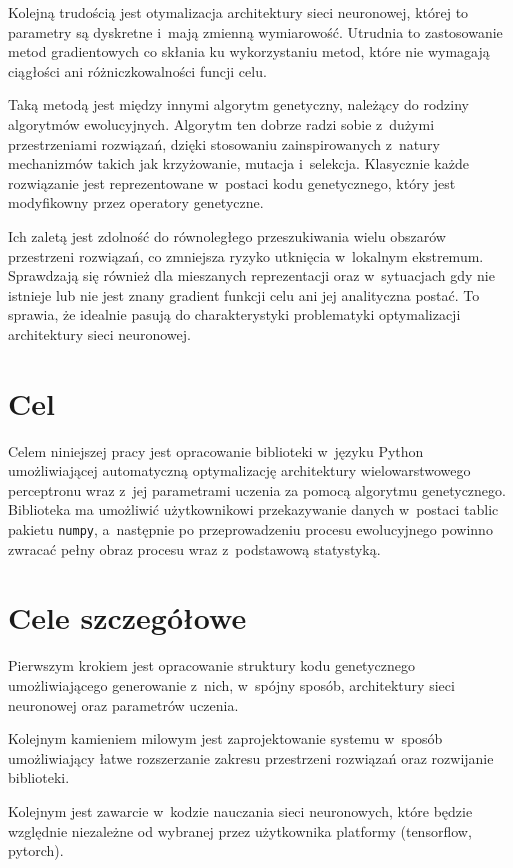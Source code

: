 Kolejną trudością jest otymalizacja architektury
sieci neuronowej, której to parametry
są dyskretne i~mają zmienną wymiarowość.
Utrudnia to zastosowanie metod gradientowych
co skłania ku wykorzystaniu metod,
które nie wymagają ciągłości
ani różniczkowalności funcji celu. 

Taką metodą jest między innymi algorytm genetyczny,
należący do rodziny algorytmów ewolucyjnych.
Algorytm ten dobrze radzi sobie
z~dużymi przestrzeniami rozwiązań,
dzięki stosowaniu zainspirowanych
z~natury mechanizmów takich jak
krzyżowanie, mutacja i~selekcja.
Klasycznie każde rozwiązanie jest reprezentowane
w~postaci kodu genetycznego, który jest modyfikowny
przez operatory genetyczne.

Ich zaletą jest zdolność do równoległego
przeszukiwania wielu obszarów przestrzeni rozwiązań,
co zmniejsza ryzyko utknięcia w~lokalnym ekstremum.
Sprawdzają się również dla mieszanych reprezentacji
oraz w~sytuacjach gdy nie istnieje
lub nie jest znany gradient funkcji celu
ani jej analityczna postać.
To sprawia, że idealnie pasują
do charakterystyki problematyki optymalizacji
architektury sieci neuronowej.

\section*{Cel}
Celem niniejszej pracy jest opracowanie biblioteki
w~języku Python umożliwiającej automatyczną
optymalizację architektury wielowarstwowego
perceptronu wraz z~jej parametrami uczenia
za pomocą algorytmu genetycznego.
Biblioteka ma umożliwić użytkownikowi przekazywanie
danych w~postaci tablic pakietu \texttt{numpy},
a~następnie po przeprowadzeniu procesu ewolucyjnego
powinno zwracać pełny obraz procesu wraz
z~podstawową statystyką.

\section*{Cele szczegółowe}
Pierwszym krokiem jest opracowanie struktury
kodu genetycznego umożliwiającego generowanie z~nich,
w~spójny sposób, architektury sieci neuronowej
oraz parametrów uczenia.

Kolejnym kamieniem milowym jest zaprojektowanie systemu
w~sposób umożliwiający łatwe rozszerzanie zakresu
przestrzeni rozwiązań oraz rozwijanie biblioteki. 

Kolejnym jest zawarcie w~kodzie nauczania
sieci neuronowych, które będzie względnie niezależne
od wybranej przez użytkownika platformy
(tensorflow, pytorch).

